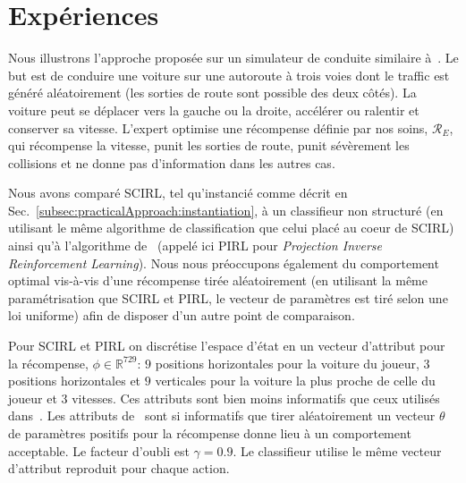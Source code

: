 \documentclass[english,utf8]{./hermes-journal}
\newcommand{\R}{\mathcal{R}}
\begin{document}
\section{Expériences}
\label{sec:experiments}

Nous illustrons l'approche proposée sur un simulateur de conduite similaire à~\cite{Abbeel:2004,Syed:2008:game}.  Le but est de conduire une voiture sur une autoroute à trois voies dont le traffic est généré aléatoirement (les sorties de route sont possible des deux côtés). La voiture peut se déplacer vers la gauche ou la droite, accélérer ou ralentir et conserver sa vitesse. L'expert optimise une récompense définie par nos soins, $\R_E$, qui récompense la vitesse, punit les sorties de route, punit sévèrement les collisions et ne donne pas d'information dans les autres cas.

Nous avons comparé SCIRL, tel qu'instancié comme décrit en
Sec.~\ref{subsec:practicalApproach:instantiation}, à un classifieur non structuré (en utilisant le même algorithme de classification que celui placé au coeur de SCIRL) ainsi qu'à l'algorithme de~\cite{Abbeel:2004} (appelé ici PIRL pour \emph{
Projection Inverse Reinforcement Learning}). Nous nous préoccupons également du comportement optimal vis-à-vis d'une récompense tirée aléatoirement (en utilisant la même paramétrisation que SCIRL et PIRL, le vecteur de paramètres est tiré selon une loi uniforme) afin de disposer d'un autre point de comparaison.

Pour SCIRL et PIRL on discrétise l'espace d'état en un vecteur d'attribut pour la récompense, $\phi\in\mathbb{R}^{729}$: $9$ positions horizontales pour la voiture du joueur, $3$ positions horizontales et $9$ verticales pour la voiture la plus proche de celle du joueur et $3$ vitesses. Ces attributs sont bien moins informatifs que ceux utilisés dans~\cite{Abbeel:2004,Syed:2008:game}. Les attributs de~\cite{Syed:2008:game} sont si informatifs que tirer aléatoirement un vecteur $\theta$ de paramètres positifs pour la récompense donne lieu à un comportement acceptable. Le facteur d'oubli est $\gamma = 0.9$. Le classifieur utilise le même vecteur d'attribut reproduit pour chaque action.
\end{document}
